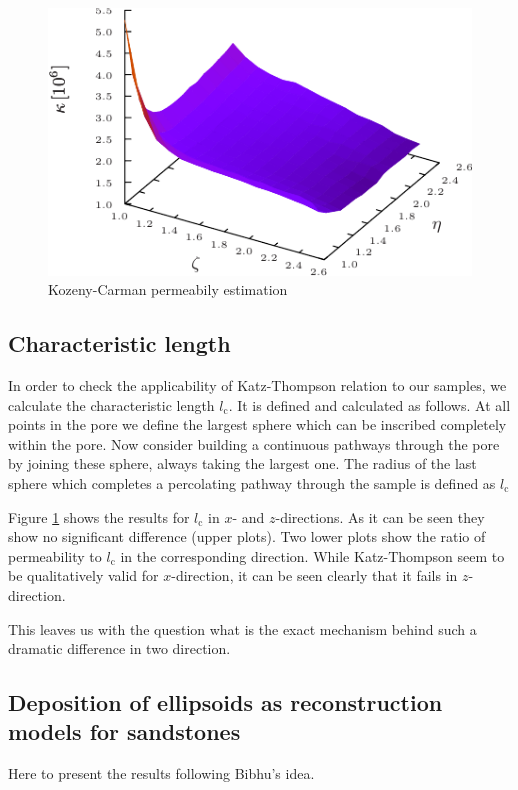 \documentclass[aps,twocolumn,superscriptaddress,showpacs,showkeys]{revtex4-1}
\newcommand{\lc}{{l_{\mathrm{c}}}}  %
\begin{document}
\begin{figure}[h]
\begin{center}
\includegraphics*[width=1.03\columnwidth]{data-figs/kozeny_carman}
\caption{Kozeny-Carman permeabily estimation}
\label{fig:lc}
\end{center}
\end{figure}

\subsection{Characteristic length}
\label{sec:lc}

In order to check the applicability of Katz-Thompson relation to our samples,
we calculate the characteristic length $\lc$. It is defined and calculated as
follows. At all points in the pore we define the largest sphere which can be
inscribed completely within the pore. Now consider building a continuous
pathways through the pore by joining these sphere, always taking the largest
one. The radius of the last sphere which completes a percolating pathway
through the sample is defined as $\lc$

Figure \ref{fig:lc} shows the results for $\lc$ in $x$- and $z$-directions.
As it can be seen they show no significant difference (upper plots). Two lower
plots show the ratio of permeability to $\lc$ in the corresponding direction.
While Katz-Thompson seem to be qualitatively valid for $x$-direction, it can
be seen clearly that it fails in $z$-direction.

This leaves us with the question what is the exact mechanism behind such a
dramatic difference in two direction.

\subsection{Deposition of ellipsoids as reconstruction models for sandstones}
\label{sec:sandstone}
Here to present the results following Bibhu's idea.
\end{document}
